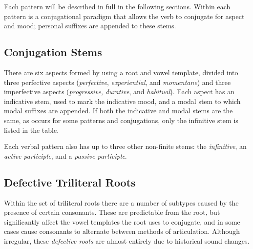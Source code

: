 \documentclass[grammar]{subfiles}
\begin{document}
%        

%        


Each pattern will be described in full in the following sections.  Within each
pattern is a conjugational paradigm that allows the verb to conjugate for
aspect and mood; personal suffixes are appended to these stems.


\subsection{Conjugation Stems}
\label{sssec:vm:conjugation}

There are six aspects formed by using a root and vowel template, divided into
three perfective aspects (\emph{perfective}, \emph{experiential}, and
\emph{momentane}) and three imperfective aspects (\emph{progressive},
\emph{durative}, and \emph{habitual}).  Each aspect has an indicative stem,
used to mark the indicative mood, and a modal stem to which modal suffixes are
appended.  If both the indicative and modal stems are the same, as occurs for
some patterns and conjugations, only the infinitive stem is listed in the
table. 

Each verbal pattern also has up to three other non-finite stems: the
\emph{infinitive}, an \emph{active participle}, and a \emph{passive
participle}.  


\subsection{Defective Triliteral Roots}
\label{ssec:vm:defective_roots}

Within the set of triliteral roots there are a number of subtypes caused by the
presence of certain consonants.  These are predictable from the root, but
significantly affect the vowel templates the root uses to conjugate, and in
some cases cause consonants to alternate between methods of articulation.
Although irregular, these \emph{defective roots} are almost entirely due to
historical sound changes. 

\end{document}
